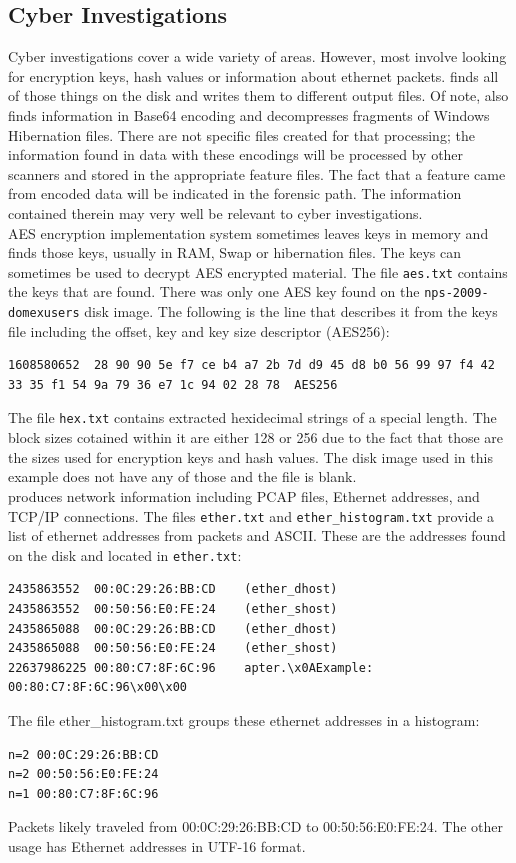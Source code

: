 \subsection{Cyber Investigations}
Cyber investigations cover a wide variety of areas. However, most involve looking for encryption keys, hash values or information about ethernet packets. \bulk finds all of those things on the disk and writes them to different output files. Of note, \bulk also finds information in Base64 encoding and decompresses fragments of Windows Hibernation files. There are not specific files created for that processing; the information found in data with these encodings will be processed by other scanners and stored in the appropriate feature files. The fact that a feature came from encoded data will be indicated in the forensic path. The information contained therein may very well be relevant to cyber investigations.\\

AES encryption implementation system sometimes leaves keys in memory and \bulk finds those keys, usually in RAM, Swap or hibernation files. The keys can sometimes be used to decrypt AES encrypted material. The file \texttt{aes.txt} contains the keys that are found. There was only one AES key found on the \texttt{nps-2009-domexusers} disk image. The following is the line that describes it from the keys file including the offset, key and key size descriptor (AES256):
\lstset{style=customfile}
\begin{lstlisting}
1608580652	28 90 90 5e f7 ce b4 a7 2b 7d d9 45 d8 b0 56 99 97 f4 42 
33 35 f1 54 9a 79 36 e7 1c 94 02 28 78 	AES256
\end{lstlisting}

The file \texttt{hex.txt} contains extracted hexidecimal strings of a special length. The block sizes cotained within it are either 128 or 256 due to the fact that those are the sizes used for encryption keys and hash values. The disk image used in this example does not have any of those and the file is blank.\\

\bulk produces network information including PCAP files, Ethernet addresses, and TCP/IP connections. The files \texttt{ether.txt} and \texttt{ether\_histogram.txt} provide a list of ethernet  addresses from packets and ASCII. These are the addresses found on the disk and located in \texttt{ether.txt}:
\lstset{style=customfile}
\begin{lstlisting}
2435863552	00:0C:29:26:BB:CD	 (ether_dhost) 
2435863552	00:50:56:E0:FE:24	 (ether_shost) 
2435865088	00:0C:29:26:BB:CD	 (ether_dhost) 
2435865088	00:50:56:E0:FE:24	 (ether_shost) 
22637986225	00:80:C7:8F:6C:96	 apter.\x0AExample: 00:80:C7:8F:6C:96\x00\x00
\end{lstlisting}
The file {ether\_histogram.txt} groups these ethernet addresses in a histogram:
\lstset{style=customfile}
\begin{lstlisting}
n=2	00:0C:29:26:BB:CD
n=2	00:50:56:E0:FE:24
n=1	00:80:C7:8F:6C:96
\end{lstlisting}
Packets likely traveled from 00:0C:29:26:BB:CD to 00:50:56:E0:FE:24.  The other usage has Ethernet addresses in UTF-16 format.\\

